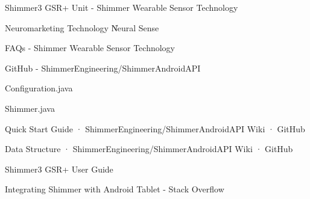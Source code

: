 Shimmer3 GSR+ Unit - Shimmer Wearable Sensor Technology


Neuromarketing Technology \| Neural Sense


FAQs - Shimmer Wearable Sensor Technology


GitHub - ShimmerEngineering/ShimmerAndroidAPI


Configuration.java


Shimmer.java


Quick Start Guide · ShimmerEngineering/ShimmerAndroidAPI Wiki · GitHub


Data Structure · ShimmerEngineering/ShimmerAndroidAPI Wiki · GitHub


Shimmer3 GSR+ User Guide


Integrating Shimmer with Android Tablet - Stack Overflow
